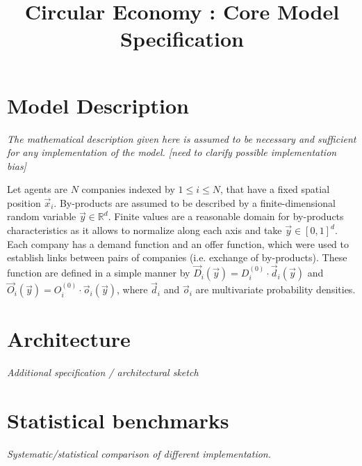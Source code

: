 

\title{Circular Economy : Core Model Specification
}

\date{}

\maketitle

\justify


\begin{abstract}

\end{abstract}




\section{Model Description}

\textit{The mathematical description given here is assumed to be necessary and sufficient for any implementation of the model. [need to clarify possible implementation bias]}


Let agents are $N$ companies indexed by $1\leq i\leq N$, that have a fixed spatial position $\vec{x}_i$. By-products are assumed to be described by a finite-dimensional random variable $\vec{y}\in \mathbb{R}^d$. Finite values are a reasonable domain for by-products characteristics as it allows to normalize along each axis and take $\vec{y} \in \left[0,1\right]^d$. Each company has a demand function and an offer function, which were used to establish links between pairs of companies (i.e. exchange of by-products). These function are defined in a simple manner by $\vec{D}_i (\vec{y})= D_i^{(0)}\cdot \vec{d}_i (\vec{y})$ and $\vec{O}_i (\vec{y})= O_i^{(0)}\cdot \vec{o}_i (\vec{y})$, where $\vec{d}_i$ and $\vec{o}_i$ are multivariate probability densities.


\section{Architecture}

\textit{Additional specification / architectural sketch}



\section{Statistical benchmarks}

\textit{Systematic/statistical comparison of different implementation.}








%
%



